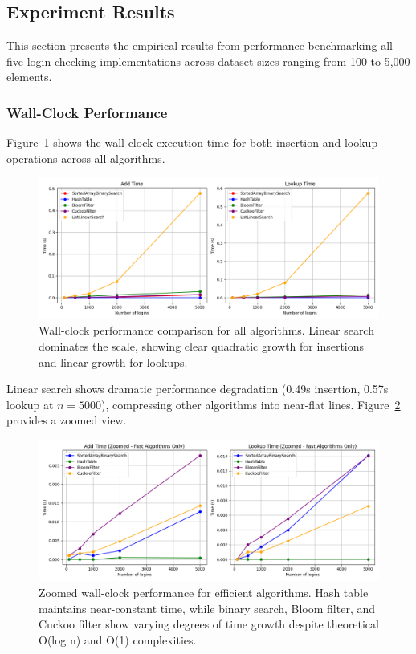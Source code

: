 \subsection{Experiment Results}

This section presents the empirical results from performance benchmarking all five login checking implementations across dataset sizes ranging from 100 to 5,000 elements.

\subsubsection{Wall-Clock Performance}

Figure~\ref{fig:performance_full} shows the wall-clock execution time for both insertion and lookup operations across all algorithms.

\begin{figure}[h]
    \centering
    \includegraphics[width=\textwidth]{../img/login_checker_performance.png}
    \caption{Wall-clock performance comparison for all algorithms. Linear search dominates the scale, showing clear quadratic growth for insertions and linear growth for lookups.}
    \label{fig:performance_full}
\end{figure}

Linear search shows dramatic performance degradation (0.49s insertion, 0.57s lookup at $n=5000$), compressing other algorithms into near-flat lines. Figure~\ref{fig:performance_zoomed} provides a zoomed view.

\begin{figure}[h]
    \centering
    \includegraphics[width=\textwidth]{../img/login_checker_performance_zoomed.png}
    \caption{Zoomed wall-clock performance for efficient algorithms. Hash table maintains near-constant time, while binary search, Bloom filter, and Cuckoo filter show varying degrees of time growth despite theoretical O(log n) and O(1) complexities.}
    \label{fig:performance_zoomed}
\end{figure}


